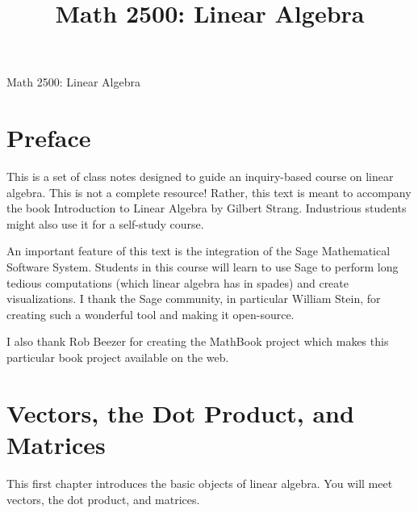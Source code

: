 \documentclass[10pt,]{book}
\title{Math 2500: Linear Algebra}
\author{}
\date{}
\theoremstyle{plain}
\theoremstyle{definition}
\numberwithin{equation}{section}
\begin{document}
\frontmatter
\thispagestyle{empty}
\begin{center}
{\Huge Math 2500: Linear Algebra}
\end{center}\par
{}
\clearpage
\thispagestyle{empty}
\clearpage
\maketitle
\clearpage
\thispagestyle{empty}
\clearpage
\setcounter{tocdepth}{1}
\renewcommand*\contentsname{Contents}
\tableofcontents
\chapter{Preface}
This is a set of class notes designed to guide an inquiry-based course
      on linear algebra. This is not a complete resource! Rather, this text is
      meant to accompany the book Introduction to Linear Algebra by
      Gilbert Strang. Industrious students might also use it for a self-study
      course.
\par
An important feature of this text is the integration of the Sage
      Mathematical Software System. Students in this course will learn to use
      Sage to perform long tedious computations (which linear algebra has in
      spades) and create visualizations.
I thank the Sage community, in particular William Stein, for creating
      such a wonderful tool and making it open-source.
\par
I also thank Rob Beezer for creating the MathBook project which makes
      this particular book project available on the web.
\mainmatter
\typeout{************************************************}
\typeout{************************************************}
\chapter[Vectors, the Dot Product, and Matrices]{Vectors, the Dot Product, and Matrices}\label{chapter-basic-objects}

      This first chapter introduces the basic objects of linear algebra.
      You will meet vectors, the dot product, and matrices.
\par
\end{document}
